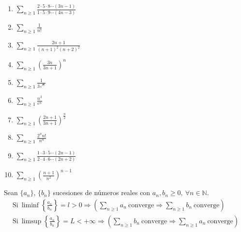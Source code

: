 \begin{ejercicio}
\begin{enumerate}
        \item $\displaystyle\sum_{n \geq 1} \frac{2 \cdot 5 \cdot 8 \cdots (3n-1)}{1 \cdot 5 \cdot 9 \cdots (4n-3)}$

        \item $\displaystyle\sum_{n \geq 1} \frac{1}{n!}$

        \item $\displaystyle\sum_{n \geq 1} \frac{2n+1}{(n+1)^2 (n+2)^2}$

        \item $\displaystyle\sum_{n \geq 1} \left( \frac{3n}{3n+1}\right)^n$

        \item $\displaystyle\sum_{n \geq 1} \frac{1}{3^{\sqrt{n}}}$

        \item $\displaystyle\sum_{n \geq 1} \frac{n^3}{e^n}$

        \item $\displaystyle\sum_{n \geq 1} \left( \frac{2n+1}{3n+1} \right)^{\frac{n}{2}}$

        \item $\displaystyle\sum_{n \geq 1} \frac{2^n n!}{n^n}$

        \item $\displaystyle\sum_{n \geq 1} \frac{1 \cdot 3 \cdot 5 \cdots (2n-1)}{2 \cdot 4 \cdot 6 \cdots (2n+2)}$

        \item $\displaystyle\sum_{n \geq 1} \left( \frac{n+1}{n^2} \right)^{n-1}$
    \end{enumerate}
\end{ejercicio}
\renewcommand{\theenumi}{\roman{enumi}} %

\begin{ejercicio}
    Sean $\{a_n\}$, $\{b_n\}$ sucesiones de números reales con $a_n,b_n \geq 0, ~ \forall n \in \mathbb{N}$.
    \begin{gather*}
        \text{Si} ~ \liminf \left\{ \frac{a_n}{b_n} \right\} = l > 0 \Longrightarrow \left( \displaystyle\sum_{n \geq 1} a_n ~ \text{converge} \Longrightarrow \displaystyle\sum_{n \geq 1} b_n ~ \text{converge} \right)\\
        \text{Si} ~ \limsup \left\{ \frac{a_n}{b_n} \right\} = L < + \infty \Longrightarrow \left( \displaystyle\sum_{n \geq 1} b_n ~ \text{converge} \Longrightarrow \displaystyle\sum_{n \geq 1} a_n ~ \text{converge} \right)
    \end{gather*}
\end{ejercicio}


